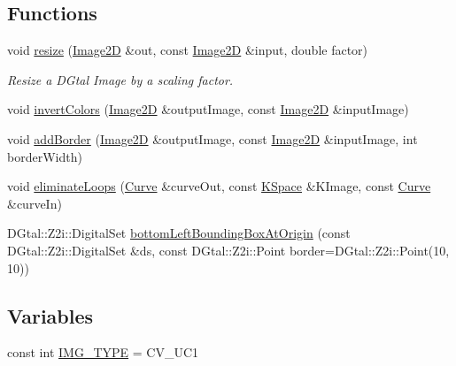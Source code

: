 \subsection*{Functions}
\begin{DoxyCompactItemize}
\item 
void \hyperlink{namespaceDIPaCUS_1_1Transform_a371002604d1d6ab5c4667b7e37bb9834}{resize} (\hyperlink{namespaceDIPaCUS_1_1Transform_a73f8942865bc5b3a01401bf07efd3734}{Image2D} \&out, const \hyperlink{namespaceDIPaCUS_1_1Transform_a73f8942865bc5b3a01401bf07efd3734}{Image2D} \&input, double factor)
\begin{DoxyCompactList}\small\item\em Resize a D\+Gtal Image by a scaling factor. \end{DoxyCompactList}\item 
void \hyperlink{namespaceDIPaCUS_1_1Transform_a992b6ab60add3a4a2b9580a166ba8a65}{invert\+Colors} (\hyperlink{namespaceDIPaCUS_1_1Transform_a73f8942865bc5b3a01401bf07efd3734}{Image2D} \&output\+Image, const \hyperlink{namespaceDIPaCUS_1_1Transform_a73f8942865bc5b3a01401bf07efd3734}{Image2D} \&input\+Image)
\item 
void \hyperlink{namespaceDIPaCUS_1_1Transform_a92fb5b6ae4eda503db4473c7c041dcf5}{add\+Border} (\hyperlink{namespaceDIPaCUS_1_1Transform_a73f8942865bc5b3a01401bf07efd3734}{Image2D} \&output\+Image, const \hyperlink{namespaceDIPaCUS_1_1Transform_a73f8942865bc5b3a01401bf07efd3734}{Image2D} \&input\+Image, int border\+Width)
\item 
void \hyperlink{namespaceDIPaCUS_1_1Transform_ae6c5a2917a8b570acbc49b7f2e3727ff}{eliminate\+Loops} (\hyperlink{namespaceDIPaCUS_1_1Transform_ae8200b02a170f9d9f68b8d345924b2c3}{Curve} \&curve\+Out, const \hyperlink{namespaceDIPaCUS_1_1Transform_a29a1b6c9e9e766045633377156b5a81c}{K\+Space} \&K\+Image, const \hyperlink{namespaceDIPaCUS_1_1Transform_ae8200b02a170f9d9f68b8d345924b2c3}{Curve} \&curve\+In)
\item 
D\+Gtal\+::\+Z2i\+::\+Digital\+Set \hyperlink{namespaceDIPaCUS_1_1Transform_ab5da680d9da471684a61f0241eab5312}{bottom\+Left\+Bounding\+Box\+At\+Origin} (const D\+Gtal\+::\+Z2i\+::\+Digital\+Set \&ds, const D\+Gtal\+::\+Z2i\+::\+Point border=D\+Gtal\+::\+Z2i\+::\+Point(10, 10))
\end{DoxyCompactItemize}
\subsection*{Variables}
\begin{DoxyCompactItemize}
\item 
const int \hyperlink{namespaceDIPaCUS_1_1Transform_aba84627b64a891dd2fb04151ef8e8b51}{I\+M\+G\+\_\+\+T\+Y\+PE} = C\+V\+\_\+U\+C1
\end{DoxyCompactItemize}



